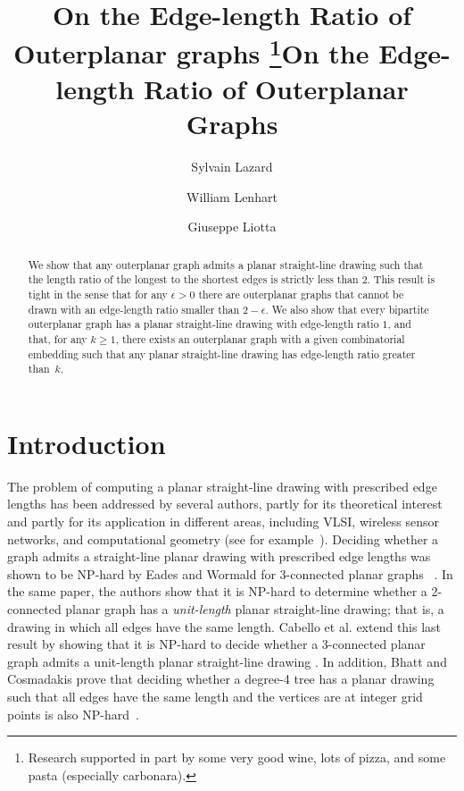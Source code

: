 \documentclass[orivec]{llncs}
\title{On the Edge-length Ratio of Outerplanar graphs \thanks{Research supported in part by some very good wine, lots of pizza, and some pasta (especially carbonara).}}
\title{On the Edge-length Ratio of Outerplanar Graphs}
\author{Sylvain Lazard\inst{1} \and
William Lenhart\inst{2} \and
Giuseppe Liotta\inst{3}
}
\institute{Inria, CNRS, U. Lorraine, France,~\email{sylvain.lazard@inria.fr}\and
Williams College, US,~\email{wlenhart@williams.edu}\and
U. of Perugia, Italy,~\email{giuseppe.liotta@unipg.it}}
\begin{document}
\maketitle

\begin{abstract}

We show that any outerplanar graph admits a planar straight-line drawing such that  the length ratio
of the longest to the shortest edges is strictly less than $2$.
This result is tight in the sense that for any $\epsilon > 0$ there are outerplanar graphs
that cannot be drawn with an edge-length ratio smaller than $2 - \epsilon$.
We also show that every bipartite outerplanar graph
has a planar straight-line drawing with edge-length ratio $1$, and that, for any $k \geq 1$, there
exists an outerplanar graph with a given combinatorial embedding such that  any
planar straight-line drawing has edge-length ratio greater than~$k$.


\end{abstract}


\section{Introduction}\label{se:intro}

The problem of computing a planar straight-line drawing with prescribed edge lengths has been addressed by several authors, partly for its theoretical interest and partly  for its application in different areas, including VLSI, wireless sensor networks, and computational geometry (see for example~\cite{DBLP:journals/siamdm/BattistaV96,DBLP:conf/infocom/DohertyPG01,DBLP:series/natosec/HeldKRV11,DBLP:conf/usenix/SavareseRL02}). Deciding
whether a graph admits a straight-line planar drawing with prescribed edge lengths was shown to be
NP-hard by Eades and Wormald for 3-connected planar graphs ~\cite{DBLP:journals/dam/EadesW90}.
In the same paper, the authors show that it is NP-hard to determine whether a 2-connected planar graph has a {\em unit-length} planar straight-line drawing; that is, a drawing in which all edges have the same length.  Cabello et al. extend this last result by showing that it is NP-hard to decide whether a 3-connected planar graph admits a unit-length planar straight-line drawing \cite{DBLP:journals/jgaa/CabelloDR07}. In addition, Bhatt and Cosmadakis prove that deciding whether a degree-4 tree has a planar drawing such that all edges have the same length and the vertices are at integer grid points is also NP-hard~\cite{DBLP:journals/ipl/BhattC87}.
\end{document}

